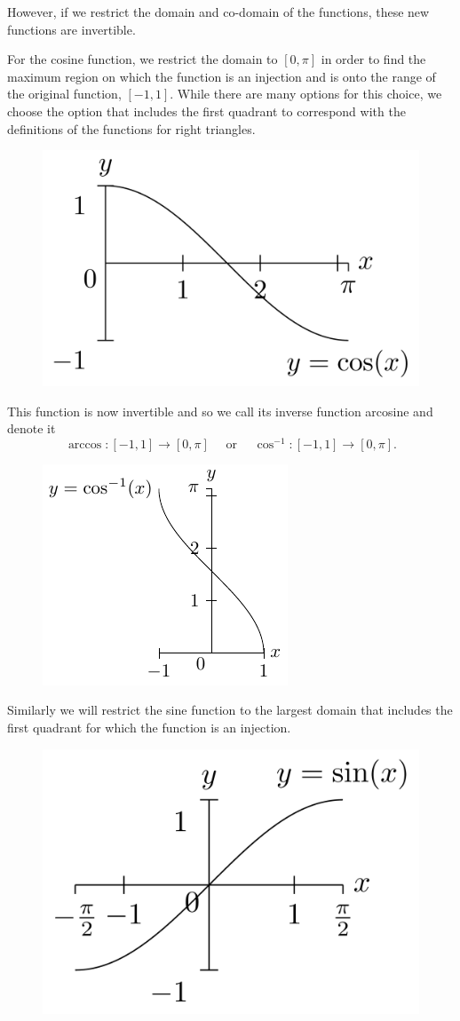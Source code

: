 \documentclass[
]{book}
\theoremstyle{definition}
\theoremstyle{definition}
\theoremstyle{definition}
\theoremstyle{remark}
\begin{document}
However, if we restrict the domain and co-domain of the functions, these new functions are invertible.

For the cosine function, we restrict the domain to \([0,\pi]\) in order to find the maximum region on which the function is an injection and is onto the range of the original function, \([-1,1]\). While there are many options for this choice, we choose the option that includes the first quadrant to correspond with the definitions of the functions for right triangles.

\begin{figure}

{\centering \includegraphics[width=0.4\linewidth]{tikz/cosine-graph-restricted} 

}

\end{figure}

This function is now invertible and so we call its inverse function arcosine and denote it
\[\arccos:[-1,1]\rightarrow [0,\pi] \quad \mbox{ or } \quad  \cos^{-1}:[-1,1]\rightarrow [0,\pi].\]

\begin{figure}

{\centering \includegraphics[width=0.4\linewidth]{tikz/arccos} 

}

\end{figure}

Similarly we will restrict the sine function to the largest domain that includes the first quadrant for which the function is an injection.

\begin{figure}

{\centering \includegraphics[width=0.4\linewidth]{tikz/sine-graph-restricted} 

}

\end{figure}
\end{document}
